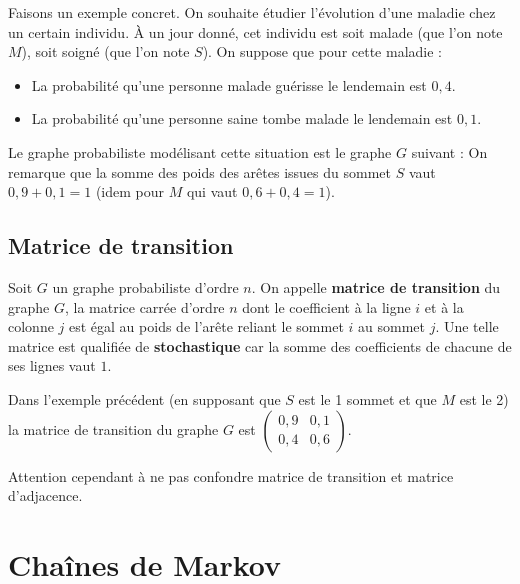 	\begin{tip}[Exemple]
		Faisons un exemple concret. On souhaite étudier l'évolution d'une maladie chez un certain individu. À un jour donné, cet individu est soit malade (que l'on note $M$), soit soigné (que l'on note $S$). On suppose que pour cette maladie :
		\begin{itemize}
			\item La probabilité qu'une personne malade guérisse le lendemain est $0,4$.
			\item La probabilité qu'une personne saine tombe malade le lendemain est $0,1$.
		\end{itemize}
		Le graphe probabiliste modélisant cette situation est le graphe $G$ suivant :
		On remarque que la somme des poids des arêtes issues du sommet $S$ vaut $0,9+0,1 = 1$ (idem pour $M$ qui vaut $0,6+0,4 = 1$).
	\end{tip}
	
	\subsection{Matrice de transition}
	
	\begin{formula}[Définition]
		Soit $G$ un graphe probabiliste d'ordre $n$. On appelle \textbf{matrice de transition} du graphe $G$, la matrice carrée d'ordre $n$ dont le coefficient à la ligne $i$ et à la colonne $j$ est égal au poids de l'arête reliant le sommet $i$ au sommet $j$.
		\newpar
		Une telle matrice est qualifiée de \textbf{stochastique} car la somme des coefficients de chacune de ses lignes vaut $1$.
	\end{formula}
	
	\begin{tip}[Exemple]
		Dans l'exemple précédent (en supposant que $S$ est le 1\ier{} sommet et que $M$ est le 2\ieme{}) la matrice de transition du graphe $G$ est $\displaystyle{\begin{pmatrix} 0,9 & 0,1 \\ 0,4 & 0,6 \end{pmatrix}}$.
	\end{tip}
	
	Attention cependant à ne pas confondre matrice de transition et matrice d'adjacence.
	
	\section{Chaînes de Markov}
	
